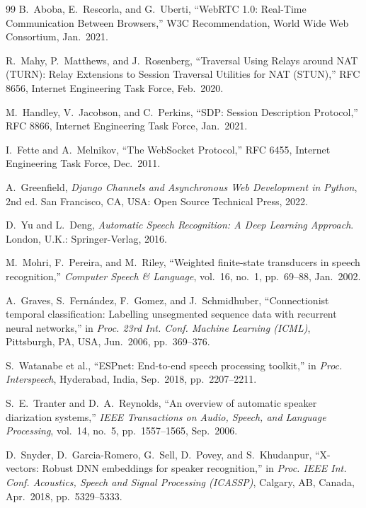 \documentclass[12pt,oneside,letterpaper]{report}
\numberwithin{equation}{chapter} %
\begin{document}
\begin{singlespace}
\begin{thebibliography}{99}
B.~Aboba, E.~Rescorla, and G.~Uberti, ``WebRTC 1.0: Real-Time Communication Between Browsers,'' W3C Recommendation, World Wide Web Consortium, Jan.~2021.

R.~Mahy, P.~Matthews, and J.~Rosenberg, ``Traversal Using Relays around NAT (TURN): Relay Extensions to Session Traversal Utilities for NAT (STUN),'' RFC 8656, Internet Engineering Task Force, Feb.~2020.

M.~Handley, V.~Jacobson, and C.~Perkins, ``SDP: Session Description Protocol,'' RFC 8866, Internet Engineering Task Force, Jan.~2021.

I.~Fette and A.~Melnikov, ``The WebSocket Protocol,'' RFC 6455, Internet Engineering Task Force, Dec.~2011.

A.~Greenfield, \emph{Django Channels and Asynchronous Web Development in Python}, 2nd ed. San Francisco, CA, USA: Open Source Technical Press, 2022.

D.~Yu and L.~Deng, \emph{Automatic Speech Recognition: A Deep Learning Approach}. London, U.K.: Springer-Verlag, 2016.

M.~Mohri, F.~Pereira, and M.~Riley, ``Weighted finite-state transducers in speech recognition,'' \emph{Computer Speech \& Language}, vol.~16, no.~1, pp.~69--88, Jan.~2002.

A.~Graves, S.~Fernández, F.~Gomez, and J.~Schmidhuber, ``Connectionist temporal classification: Labelling unsegmented sequence data with recurrent neural networks,'' in \emph{Proc. 23rd Int. Conf. Machine Learning (ICML)}, Pittsburgh, PA, USA, Jun.~2006, pp.~369--376.

S.~Watanabe et al., ``ESPnet: End-to-end speech processing toolkit,'' in \emph{Proc. Interspeech}, Hyderabad, India, Sep.~2018, pp.~2207--2211.

S.~E.~Tranter and D.~A.~Reynolds, ``An overview of automatic speaker diarization systems,'' \emph{IEEE Transactions on Audio, Speech, and Language Processing}, vol.~14, no.~5, pp.~1557--1565, Sep.~2006.

D.~Snyder, D.~Garcia-Romero, G.~Sell, D.~Povey, and S.~Khudanpur, ``X-vectors: Robust DNN embeddings for speaker recognition,'' in \emph{Proc. IEEE Int. Conf. Acoustics, Speech and Signal Processing (ICASSP)}, Calgary, AB, Canada, Apr.~2018, pp.~5329--5333.


\end{thebibliography}
\end{singlespace}
\end{document}

